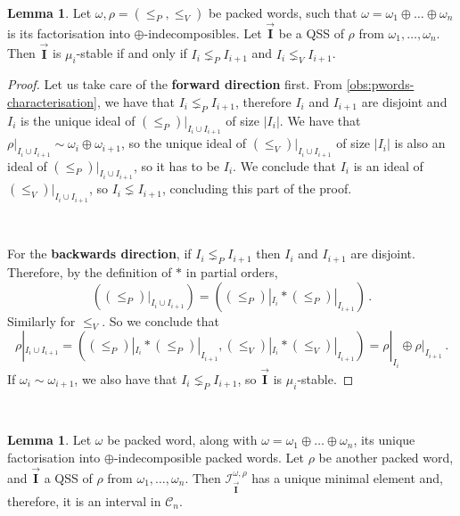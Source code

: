 \documentclass[12pt, reqno]{amsart}
\theoremstyle{definition}
\newtheorem{lm}[thm]{Lemma}
\newcommand{\III}{\vec{\mathbf{I}}}
\begin{document}
\

\begin{lm}\label{lm:QSSpackedWords}
Let $\omega, \rho = (\leq_P, \leq_V)$ be packed words, such that $\omega = \omega_1 \oplus \dots \oplus \omega_n$ is its factorisation into $\oplus$-indecomposibles.
Let $\III$ be a QSS of $\rho$ from $\omega_1, \dots , \omega_n$.
Then $\III$ is $\mu_i$-stable if and only if $I_i \lneq_P I_{i+1}$ and $I_i \lneq_V I_{i+1}$.
\end{lm}


\begin{proof}
Let us take care of the \textbf{forward direction} first.
From \cref{obs:pwords-characterisation}, we have that $I_i \lneq_P I_{i+1}$, therefore $I_i$ and $I_{i+1}$ are disjoint and $I_i$ is the unique ideal of $(\leq_P)|_{I_i \cup I_{i+1}}$ of size $|I_i|$.
We have that $\rho|_{I_i \cup I_{i+1}} \sim \omega_i \oplus \omega_{i+1}$, so the unique ideal of $(\leq_V)|_{I_i \cup I_{i+1}}$ of size $|I_i|$ is also an ideal of $(\leq_P)|_{I_i \cup I_{i+1}}$, so it has to be $I_i$.
We conclude that $I_i$ is an ideal of $(\leq_V)|_{I_i \cup I_{i+1}}$, so $I_i \lneq I_{i+1}$, concluding this part of the proof.

\

For the \textbf{backwards direction}, if $I_i \lneq_P I_{i+1}$ then $I_i$ and $I_{i+1}$ are disjoint.
Therefore, by the definition of $\ast $ in partial orders, 
$$((\leq_P)|_{I_i \cup I_{i+1}}) = ((\leq_P)|_{I_i} \ast (\leq_P)|_{I_{i+1}})\, . $$
Similarly for $\leq_V$.
So we conclude that 
$$\rho|_{I_i \cup I_{i+1}} = ((\leq_P)|_{I_i} \ast (\leq_P)|_{I_{i+1}}, (\leq_V)|_{I_i} \ast (\leq_V)|_{I_{i+1}}) = \rho|_{I_i} \oplus \rho|_{I_{i+1}}\, .  $$
If $\omega_i \sim \omega_{i+1}$, we also have that $I_i \lneq_P I_{i+1}$, so $\III$ is $\mu_i$-stable.
\end{proof}

\

\begin{lm}\label{lm:minpacked}
Let $\omega$ be  packed word, along with $\omega = \omega_1 \oplus \dots \oplus \omega_n$, its unique factorisation into $\oplus$-indecomposible packed words.
Let $\rho$ be another packed word, and $\III$ a QSS of $\rho$ from $\omega_1, \dots , \omega_n$. Then $\mathcal I^{\omega, \rho}_{\III}$ has a unique minimal element and, therefore, it is an interval in $\mathcal C_n$.
\end{lm}
\end{document}
